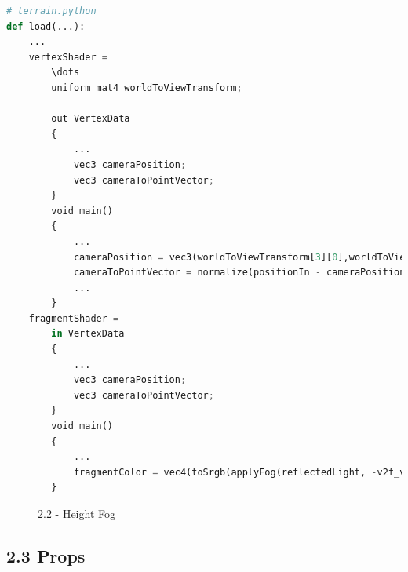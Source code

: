 \documentclass[a4 paper, 12pt]{article}
\begin{document}
\begin{lstlisting}[language=python]
# terrain.python
def load(...):
    ...
    vertexShader =
        \dots
        uniform mat4 worldToViewTransform;

        out VertexData
        {
            ...
            vec3 cameraPosition;
            vec3 cameraToPointVector;
        }
        void main()
        {
            ...
            cameraPosition = vec3(worldToViewTransform[3][0],worldToViewTransform[3][1],worldToViewTransform[3][2])
            cameraToPointVector = normalize(positionIn - cameraPosition);
            ...
        }
    fragmentShader = 
        in VertexData
        {
            ...
            vec3 cameraPosition;
            vec3 cameraToPointVector;
        }
        void main()
        {
            ...
            fragmentColor = vec4(toSrgb(applyFog(reflectedLight, -v2f_viewSpacePosition.z, cameraPosition, cameraToPointVector)), 1.0);
        }
\end{lstlisting} 
\begin{figure} [H]
    \caption{2.2 - Height Fog}   
\end{figure}


\subsection{2.3 Props}
\end{document}
